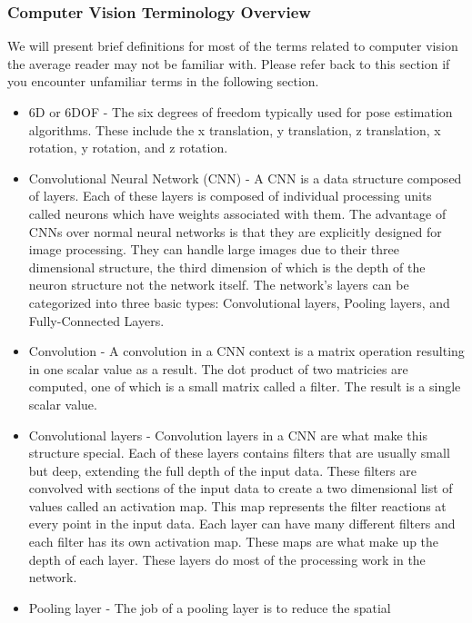 \documentclass[12pt]{article}
\begin{document}
\subsubsection{Computer Vision Terminology
Overview}\label{computer-vision-terminology-overview}

We will present brief definitions for most of the terms related to
computer vision the average reader may not be familiar with. Please
refer back to this section if you encounter unfamiliar terms in the
following section.

\begin{itemize}
\item
  6D or 6DOF - The six degrees of freedom typically used for pose
  estimation algorithms. These include the x translation, y translation,
  z translation, x rotation, y rotation, and z rotation.
\item
  Convolutional Neural Network (CNN) - A CNN is a data structure
  composed of layers. Each of these layers is composed of individual
  processing units called neurons which have weights associated with
  them. The advantage of CNNs over normal neural networks is that they
  are explicitly designed for image processing. They can handle large
  images due to their three dimensional structure, the third dimension
  of which is the depth of the neuron structure not the network itself.
  The network's layers can be categorized into three basic types:
  Convolutional layers, Pooling layers, and Fully-Connected Layers.
\item
  Convolution - A convolution in a CNN context is a matrix operation
  resulting in one scalar value as a result. The dot product of two
  matricies are computed, one of which is a small matrix called a
  filter. The result is a single scalar value.
\item
  Convolutional layers - Convolution layers in a CNN are what make this
  structure special. Each of these layers contains filters that are
  usually small but deep, extending the full depth of the input data.
  These filters are convolved with sections of the input data to create
  a two dimensional list of values called an activation map. This map
  represents the filter reactions at every point in the input data. Each
  layer can have many different filters and each filter has its own
  activation map. These maps are what make up the depth of each layer.
  These layers do most of the processing work in the network.
\item
  Pooling layer - The job of a pooling layer is to reduce the spatial

\end{itemize}
\end{document}
